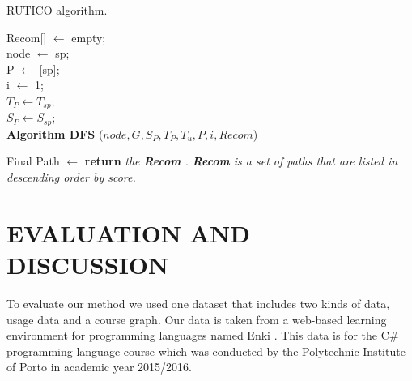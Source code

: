 \documentclass{sig-alternate}
\begin{document}
\begin{algorithm}
\caption{RUTICO algorithm.}
\label{alg:1}
    Recom[] $\leftarrow$ empty;    \\
    node $\leftarrow$ sp;\\
    P $\leftarrow$ [sp];  \\
    i $\leftarrow$ 1;\\
    $T_P \leftarrow T_{sp}$;  \\
    $S_P \leftarrow S_{sp}$;    \\
    \textbf{Algorithm DFS} ($node,G,S_P,T_P,T_u ,P,i,Recom$)
    
    Final Path $\leftarrow$ \textbf{return} \textit{the \textbf{Recom} . \textbf{Recom}  is a set of paths that are listed in descending order by score.}
\end{algorithm}

\section{EVALUATION AND DISCUSSION}
\label{sec:evaluationanddiscussion}
\noindent To evaluate our method we used one dataset that includes two kinds of data, usage data and a course graph. Our data is taken from a web-based learning environment for programming languages named Enki \cite{paiva2016enki}. This data is for the C\# programming language course which was conducted by the Polytechnic Institute of Porto in academic year 2015/2016.
\end{document}
